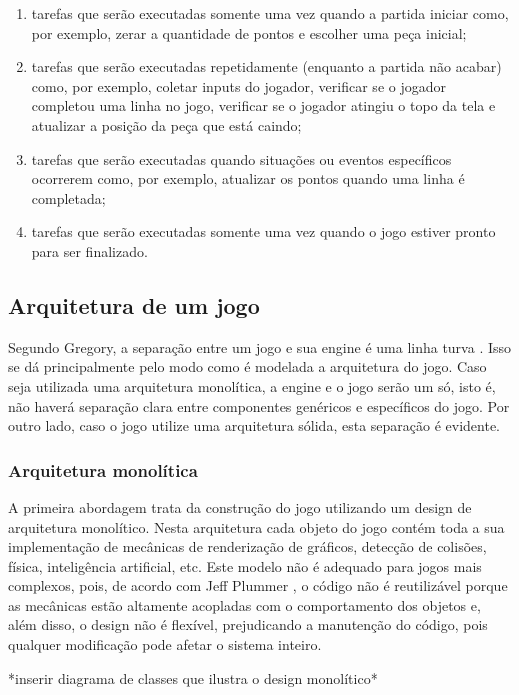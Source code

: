 \begin{enumerate}
\item tarefas que serão executadas somente uma vez quando a partida iniciar como, por exemplo, zerar a quantidade de pontos e escolher uma peça inicial;
\item tarefas que serão executadas repetidamente (enquanto a partida não acabar) como, por exemplo, coletar inputs do jogador, verificar se o jogador completou uma linha no jogo, verificar se o jogador atingiu o topo da tela e atualizar a posição da peça que está caindo;
\item tarefas que serão executadas quando situações ou eventos específicos ocorrerem como, por exemplo, atualizar os pontos quando uma linha é completada;
\item tarefas que serão executadas somente uma vez quando o jogo estiver pronto para ser finalizado.
\end{enumerate}

\subsection{Arquitetura de um jogo}

Segundo Gregory, a separação entre um jogo e sua engine é uma linha turva \cite{gregory2014game}. Isso se dá principalmente pelo modo como é modelada a arquitetura do jogo. Caso seja utilizada uma arquitetura monolítica, a engine e o jogo serão um só, isto é, não haverá separação clara entre componentes genéricos e específicos do jogo. Por outro lado, caso o jogo utilize uma arquitetura sólida, esta separação é evidente.

\subsubsection{Arquitetura monolítica}

A primeira abordagem trata da construção do jogo utilizando um design de arquitetura monolítico. Nesta arquitetura cada objeto do jogo contém toda a sua implementação de mecânicas de renderização de gráficos, detecção de colisões, física, inteligência artificial, etc. Este modelo não é adequado para jogos mais complexos, pois, de acordo com Jeff Plummer \cite{jeffthesis}, o código não é reutilizável porque as mecânicas estão altamente acopladas com o comportamento dos objetos e, além disso, o design não é flexível, prejudicando a manutenção do código, pois qualquer modificação pode afetar o sistema inteiro.

*inserir diagrama de classes que ilustra o design monolítico*

